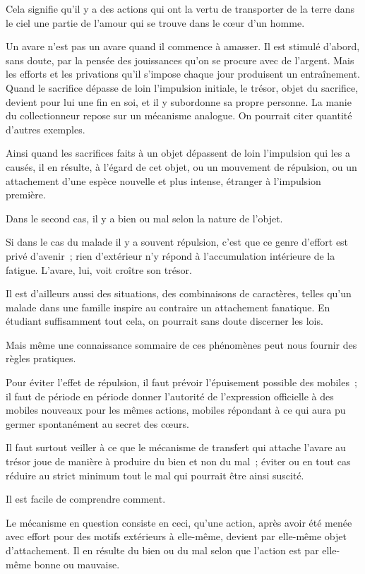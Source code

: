 \documentclass[french,twoside]{book} %
\begin{document}
Cela signifie qu'il y a des actions qui ont la vertu de transporter de la terre dans le ciel une partie de l'amour qui se trouve dans le cœur d'un homme.\par
Un avare n'est pas un avare quand il commence à amasser. Il est stimulé d'abord, sans doute, par la pensée des jouissances qu'on se procure avec de l'argent. Mais les efforts et les privations qu'il s'impose chaque jour produisent un entraînement. Quand le sacrifice dépasse de loin l'impulsion initiale, le trésor, objet du sacrifice, devient pour lui une fin en soi, et il y subordonne sa propre personne. La manie du collectionneur repose sur un mécanisme analogue. On pourrait citer quantité d'autres exemples.\par
Ainsi quand les sacrifices faits à un objet dépassent de loin l'impulsion qui les a causés, il en résulte, à l'égard de cet objet, ou un mouvement de répulsion, ou un attachement d'une espèce nouvelle et plus intense, étranger à l’impulsion première.\par
Dans le second cas, il y a bien ou mal selon la nature de l'objet.\par
Si dans le cas du malade il y a souvent répulsion, c'est que ce genre d'effort est privé d'avenir ; rien d'extérieur n'y répond à l'accumulation intérieure de la fatigue. L'avare, lui, voit croître son trésor.\par
Il est d'ailleurs aussi des situations, des combinaisons de caractères, telles qu'un malade dans une famille inspire au contraire un attachement fanatique. En étudiant suffisamment tout cela, on pourrait sans doute discerner les lois.\par
Mais même une connaissance sommaire de ces phénomènes peut nous fournir des règles pratiques.\par
Pour éviter l'effet de répulsion, il faut prévoir l'épuisement possible des mobiles ; il faut de période en période donner l'autorité de l'expression officielle à des mobiles nouveaux pour les mêmes actions, mobiles répondant à ce qui aura pu germer spontanément au secret des cœurs.\par
Il faut surtout veiller à ce que le mécanisme de transfert qui attache l'avare au trésor joue de manière à produire du bien et non du mal ; éviter ou en tout cas réduire au strict minimum tout le mal qui pourrait être ainsi suscité.\par
Il est facile de comprendre comment.\par
Le mécanisme en question consiste en ceci, qu'une action, après avoir été menée avec effort pour des motifs extérieurs à elle-même, devient par elle-même objet d'attachement. Il en résulte du bien ou du mal selon que l'action est par elle-même bonne ou mauvaise.\par
\end{document}
